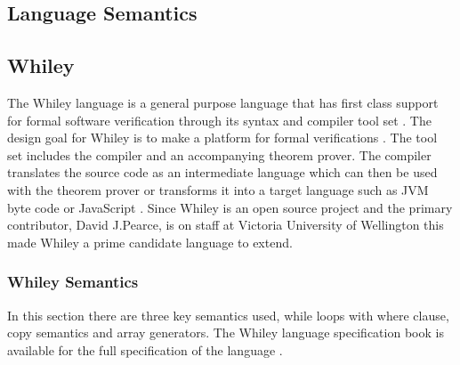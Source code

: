 \subsection{Language Semantics}

\subsection{Whiley}

The Whiley language is a general purpose language that has first class
support for formal software verification through its syntax and compiler
tool set \cite{whiley-origin}.
The design goal for Whiley is to make a platform for formal verifications \cite{whiley-origin}.
The tool set includes the compiler and an accompanying theorem prover.
The compiler translates the source code as an intermediate language which
can then be used with the theorem prover or transforms it into a target
language such as JVM byte code or JavaScript \cite{whiley-design}
\cite{wyil}.
Since Whiley is an open source project and the primary contributor, David
J.Pearce, is on staff at Victoria University of Wellington this made Whiley a
prime candidate language to extend.


\subsubsection{Whiley Semantics}

In this section there are three key semantics used, while loops with where
clause, copy semantics and array generators.
The Whiley language specification book is available for the full
specification of the language \cite{whiley-spec}.

